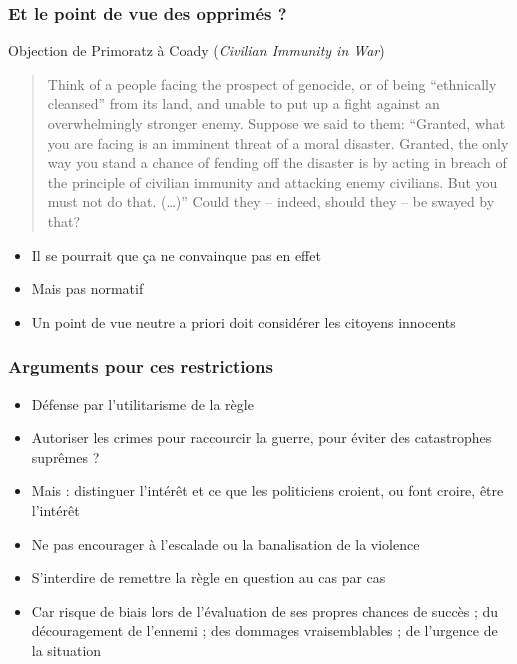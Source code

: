 \documentclass[english, french]{beamer}
\begin{document}
\begin{frame}
  \frametitle{Et le point de vue des opprimés ?}
  Objection de Primoratz à Coady (\emph{Civilian Immunity in War})
  \begin{quote}
    Think of a people facing the prospect of genocide, or of being “ethnically cleansed” from its land, and unable to put up a ﬁght against an overwhelmingly stronger enemy. Suppose we said to them: “Granted, what you are facing is an imminent threat of a moral disaster. Granted, the only way you stand a chance of fending off the disaster is by acting in breach of the principle of civilian immunity and attacking enemy civilians. But you must not do that. (…)” Could they – indeed, should they – be swayed by that?
  \end{quote}
  \vspace{-5mm}
  \begin{itemize}
    \item Il se pourrait que ça ne convainque pas en effet
    \item Mais pas normatif
    \item Un point de vue neutre a priori doit considérer les citoyens innocents
  \end{itemize}
\end{frame}

\begin{frame}
  \frametitle{Arguments pour ces restrictions}
  \begin{itemize}
    \item Défense par l’utilitarisme de la règle
    \item Autoriser les crimes pour raccourcir la guerre, pour éviter des catastrophes suprêmes ?
    \item Mais : distinguer l’intérêt et ce que les politiciens croient, ou font croire, être l’intérêt
    \item Ne pas encourager à l’escalade ou la banalisation de la violence
    \item S’interdire de remettre la règle en question au cas par cas
    \item Car risque de biais lors de l’évaluation de ses propres chances de succès ; du découragement de l’ennemi ; des dommages vraisemblables ; de l’urgence de la situation
  \end{itemize}
\end{frame}
\end{document}
